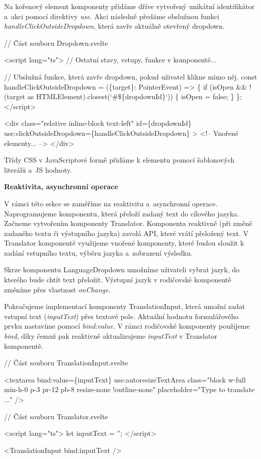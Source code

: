 Na kořenový element komponenty přidáme dříve vytvořený unikátní identifikátor a~akci pomocí direktivy \emph{use}. 
Akci následně předáme obslužnou funkci \emph{handleClickOutsideDropdown}, která zavře aktuálně otevřený dropdown.

\begin{prog}
// Část souboru Dropdown.svelte

<script lang="ts">
  // Ostatní stavy, vstupy, funkce v komponentě...

  // Ubslužná funkce, která zavře dropdown, pokud uživatel klikne mimo něj.
  const handleClickOutsideDropdown = (\{target\}: PointerEvent) => \{
    if (isOpen && !(target as HTMLElement).closest(`#\$\{dropdownId\}`)) \{
      isOpen = false;
    \}
  \};
</script>
  
<div
  class="relative inline-block text-left"
  id=\{dropdownId\}
  use:clickOutsideDropdown=\{handleClickOutsideDropdown\}
>
  <!-- Vnořené elementy... -->
</div>
\end{prog}

Třídy CSS v JavaScriptové formě přidáme k elementu pomocí šablonových literálů a~JS hodnoty.

\begin{flushleft}
  \textbf{Reaktivita, asynchronní operace}
\end{flushleft}

V rámci této sekce se zaměříme na reaktivitu a~asynchronní operace. Naprogramujeme komponentu, která přeloží zadaný text do cílového jazyka. 
Začneme vytvořením komponenty Translator. Komponenta reaktivně (při změně zadaného textu či výstupního jazyka) zavolá API, které vrátí přeložený text. 
V Translator komponentě využijeme vnořené komponenty, které budou sloužit k zadání vstupního textu, výběru jazyka a~zobrazení výsledku.

Skrze komponentu LanguageDropdown umožníme uživateli vybrat jazyk, do kterého bude chtít text přeložit. Výstupní jazyk v rodičovské komponentě změníme přes vlastnost \emph{onChange}.

Pokračujeme implementací komponenty TranslationInput, která umožní zadat vstupní text (\emph{inputText}) přes textové pole. Aktuální hodnotu formulářového prvku nastavíme pomocí \emph{bind:value}. 
V rámci rodičovské komponenty použijeme \emph{bind}, díky čemuž pak reaktivně aktualizujeme \emph{inputText} v Translator komponentě.

\begin{prog}
// Část souboru TranslationInput.svelte

<textarea
  bind:value=\{inputText\}
  use:autoresizeTextArea
  class="block w-full min-h-0 p-3 pr-12 pb-8 resize-none !outline-none"
  placeholder="Type to translate ..."
/>

// Část souboru Translator.svelte

<script lang="ts">
  let inputText = '';
</script>

<TranslationInput bind:inputText />
\end{prog}

